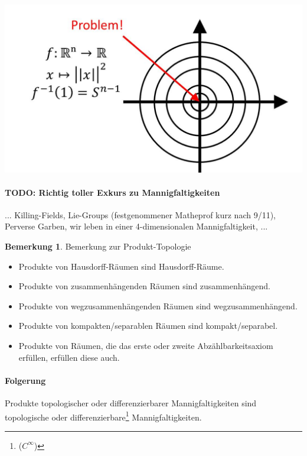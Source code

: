 \documentclass[a4paper,11pt,notitlepage]{report}
\theoremstyle{definition}
\newtheorem{remark}{Bemerkung}[chapter]
\begin{document}
\includegraphics[scale=0.3]{images/Norm_invers.jpg}

\paragraph{TODO: Richtig toller Exkurs zu Mannigfaltigkeiten}... Killing-Fields, Lie-Groups (festgenommener Matheprof kurz nach 9/11), Perverse Garben, wir leben in einer 4-dimensionalen Mannigfaltigkeit, ...

\begin{remark}{Bemerkung zur Produkt-Topologie}
\begin{itemize}
	\item Produkte von Hausdorff-Räumen sind Hausdorff-Räume.
	\item Produkte von zusammenhängenden Räumen sind zusammenhängend.
	\item Produkte von wegzusammenhängenden Räumen sind wegzusammenhängend.
	\item Produkte von kompakten/separablen Räumen sind kompakt/separabel.
	\item Produkte von Räumen, die das erste oder zweite Abzählbarkeitsaxiom erfüllen, erfüllen diese auch.
\end{itemize}
 
\paragraph{Folgerung}
	Produkte topologischer oder differenzierbarer Mannigfaltigkeiten sind topologische oder differenzierbare\footnote{($C^\infty$)} Mannigfaltigkeiten.
\end{remark}
 
\end{document}
